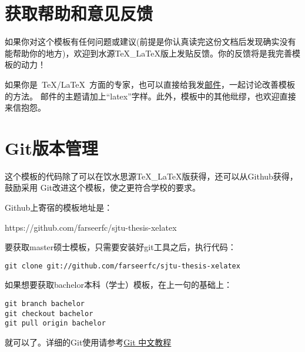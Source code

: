 \section{获取帮助和意见反馈}
\label{sec:replay}

如果你对这个模板有任何问题或建议(前提是你认真读完这份文档后发现确实没有能帮助你的地方)，欢迎到水源TeX\_LaTeX版上发贴反馈。你的反馈将是我完善模板的动力！

如果你是~\TeX/\LaTeX~方面的专家，也可以直接给我发\href{mailto:wei.jianwen@gmail.com}{邮件}，一起讨论改善模板的方法。
邮件的主题请加上``latex''字样。此外，模板中的其他纰缪，也欢迎直接来信抱怨。

\section{Git版本管理}
\label{sec:git}

这个模板的代码除了可以在饮水思源TeX\_LaTeX版获得，还可以从Github获得，鼓励采用
Git改进这个模板，使之更符合学校的要求。

Github上寄宿的模板地址是：
\begin{quate}
https://github.com/farseerfc/sjtu-thesis-xelatex
\end{quate}

要获取master硕士模板，只需要安装好git工具之后，执行代码：
\begin{lstlisting}[language="bash"]
git clone git://github.com/farseerfc/sjtu-thesis-xelatex
\end{lstlisting}

如果想要获取bachelor本科（学士）模板，在上一句的基础上：
\begin{lstlisting}[language="bash"]
git branch bachelor
git checkout bachelor
git pull origin bachelor
\end{lstlisting}

就可以了。详细的Git使用请参考\href{http://www.linuxsir.org/main/doc/git/gittutorcn.htm}{Git 中文教程}
